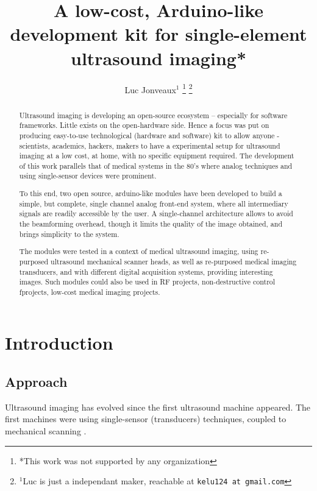 \documentclass[letterpaper, 10 pt, conference]{ieeeconf} %
\title{\LARGE \bf
A low-cost, Arduino-like development kit for single-element ultrasound imaging*
}
\author{Luc Jonveaux$^{1}$ %
\thanks{*This work was not supported by any organization}%
\thanks{$^{1}$Luc is just a independant maker, reachable at 
    {\tt\small kelu124 at gmail.com}%
}
}
\begin{document}
\maketitle
\thispagestyle{empty}
\pagestyle{empty}


\begin{abstract}

Ultrasound imaging is developing an open-source ecosystem – especially for software frameworks. Little exists on the open-hardware side. Hence a focus was put on producing easy-to-use technological (hardware and software) kit to allow anyone - scientists, academics, hackers, makers to have a experimental setup for ultrasound imaging at a low cost, at home, with no specific equipment required. The development of this work parallels that of medical systems in the 80’s where analog techniques and using single-sensor devices were prominent.

To this end, two open source, arduino-like modules have been developed to build a simple, but complete, single channel analog front-end system, where all intermediary signals are readily accessible by the user. A single-channel architecture allows to avoid the beamforming overhead, though it limits the quality of the image obtained, and brings simplicity to the system. 

The modules were tested in a context of medical ultrasound imaging, using re-purposed ultrasound mechanical scanner heads, as well as re-purposed medical imaging transducers, and with different digital acquisition systems, providing interesting images. Such modules could also be used in RF projects, non-destructive control fprojects, low-cost medical imaging projects.

\end{abstract}


\section{Introduction}

\subsection{Approach}

Ultrasound imaging has evolved since the first ultrasound machine appeared. The first machines were using single-sensor (transducers) techniques, coupled to mechanical scanning \cite{IntrotoUS}. 
\end{document}
